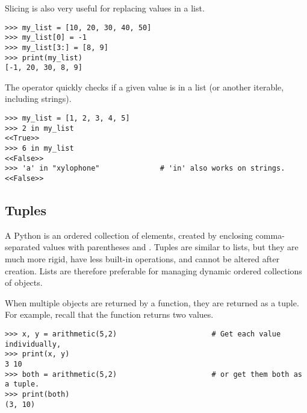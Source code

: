 Slicing is also very useful for replacing values in a list.

\begin{lstlisting}
>>> my_list = [10, 20, 30, 40, 50]
>>> my_list[0] = -1
>>> my_list[3:] = [8, 9]
>>> print(my_list)
[-1, 20, 30, 8, 9]
\end{lstlisting}

The  operator quickly checks if a given value is in a list (or another iterable, including strings).

\begin{lstlisting}
>>> my_list = [1, 2, 3, 4, 5]
>>> 2 in my_list
<<True>>
>>> 6 in my_list
<<False>>
>>> 'a' in "xylophone"              # 'in' also works on strings.
<<False>>
\end{lstlisting}

\subsection*{Tuples} %

A Python  is an ordered collection of elements, created by enclosing comma-separated values with parentheses \li{(} and \li{)}.
Tuples are similar to lists, but they are much more rigid, have less built-in operations, and cannot be altered after creation.
Lists are therefore preferable for managing dynamic ordered collections of objects.

When multiple objects are returned by a function, they are returned as a tuple.
For example, recall that the  function returns two values.

\begin{lstlisting}
>>> x, y = arithmetic(5,2)                      # Get each value individually,
>>> print(x, y)
3 10
>>> both = arithmetic(5,2)                      # or get them both as a tuple.
>>> print(both)
(3, 10)
\end{lstlisting}


